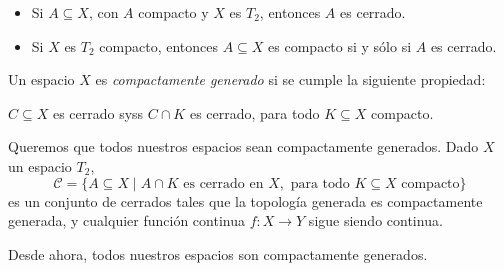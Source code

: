 \begin{tcolorbox}[colback=blue!5!white,colframe=blue!75!blue,title=\textbf{Teorema}.]
    \begin{itemize}[noitemsep, topsep=0pt]
        \item Si \(A\subseteq X\), con \(A\) compacto y \(X\) es \(T_2\), entonces \(A\) es cerrado.
        \item Si \(X\) es \(T_2\) compacto, entonces \(A\subseteq X\) es compacto si y sólo si \(A\) es cerrado.
    \end{itemize}
\end{tcolorbox}

\begin{tcolorbox}[colback=blue-violet!5!white,colframe=blue-violet!75!black,title=\textbf{Definición}.]
    Un espacio \(X\) es \textit{compactamente generado} si se cumple la siguiente propiedad: 
    
    \(C\subseteq X\) es cerrado syss \(C\cap K\) es cerrado, para todo \(K\subseteq X\) compacto.
\end{tcolorbox}


\begin{tcolorbox}
    Queremos que todos nuestros espacios sean compactamente generados.
    \tcblower
    Dado \(X\) un espacio \(T_2\), 
    \[\mathscr{C}=\{A\subseteq X \mid A\cap K \text{ es cerrado en } X, \text{ para todo } K\subseteq X \text{ compacto}\}\]
    es un conjunto de cerrados tales que la topología generada es compactamente generada, y cualquier función continua \(f\colon X\to Y\) sigue siendo continua.
\end{tcolorbox}

\begin{tcolorbox}[colback=antiquefuchsia!15!white,colframe=antiquefuchsia!75!black,title=\textbf{Convención}]
    Desde ahora, todos nuestros espacios son compactamente generados.
\end{tcolorbox}

